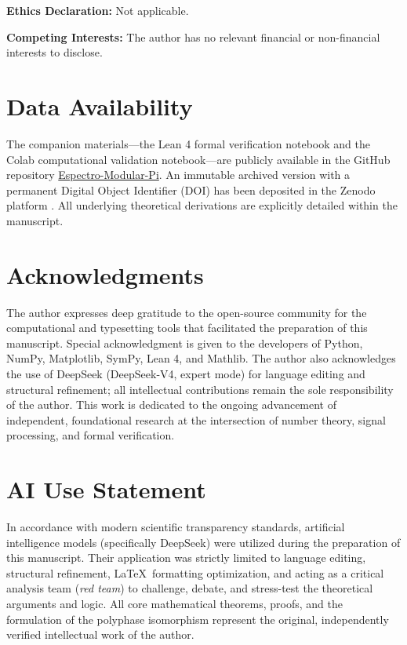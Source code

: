 \documentclass{article}
\theoremstyle{plain}
\theoremstyle{definition}
\theoremstyle{remark}
\begin{document}
\vspace{0.5em}
\noindent\textbf{Ethics Declaration:} Not applicable.

\vspace{0.5em}
\noindent\textbf{Competing Interests:} The author has no relevant financial or non-financial interests to disclose.

\section*{Data Availability}
The companion materials---the Lean 4 formal verification notebook and the Colab computational validation notebook---are publicly available in the GitHub repository \href{https://github.com/NachoPeinador/Espectro-Modular-Pi}{Espectro-Modular-Pi}. An immutable archived version with a permanent Digital Object Identifier (DOI) has been deposited in the Zenodo platform \cite{peinador_isomorphism}. All underlying theoretical derivations are explicitly detailed within the manuscript.

\section*{Acknowledgments}
The author expresses deep gratitude to the open-source community for the computational and typesetting tools that facilitated the preparation of this manuscript. Special acknowledgment is given to the developers of Python, NumPy, Matplotlib, SymPy, Lean 4, and Mathlib. The author also acknowledges the use of DeepSeek (DeepSeek-V4, expert mode) for language editing and structural refinement; all intellectual contributions remain the sole responsibility of the author. This work is dedicated to the ongoing advancement of independent, foundational research at the intersection of number theory, signal processing, and formal verification.

\section*{AI Use Statement}
In accordance with modern scientific transparency standards, artificial intelligence models (specifically DeepSeek) were utilized during the preparation of this manuscript. Their application was strictly limited to language editing, structural refinement, \LaTeX\ formatting optimization, and acting as a critical analysis team (\textit{red team}) to challenge, debate, and stress-test the theoretical arguments and logic. All core mathematical theorems, proofs, and the formulation of the polyphase isomorphism represent the original, independently verified intellectual work of the author.
\end{document}
